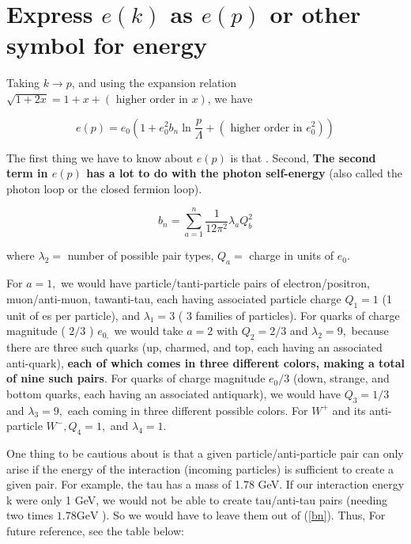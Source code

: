 \section{Express \texorpdfstring{$e(k)$ as $e(p)$ or other symbol for energy}{TEXT}}
Taking $k\to p$, and using the expansion relation $\sqrt{1+2 x}=1+x+(\text { higher order in } x)$, we have
\begin{qt}
    \begin{equation}e(p)=e_{0}\left(1+e_{0}^{2} b_{n} \ln \frac{p}{\Lambda}+\left(\text { higher order in } e_{0}^{2}\right)\right)
    \label{e(p)}
    \end{equation}
\end{qt}
The first thing we have to know about $e(p)$ is that . Second, \textbf{The second term in $e(p)$ has a lot to do with the photon self-energy }(also called the photon loop or the closed fermion loop). 
\begin{qt}
    \begin{equation}b_{n}=\sum_{a=1}^{n} \frac{1}{12 \pi^{2}} \lambda_{a} Q_{b}^{2}\end{equation}
    \label{bn}
\end{qt}
where $\lambda_{2}=$ number of possible pair types, $Q_{a}=$ charge in units of $e_{0}$.

For $a=1,$ we would have particle/tanti-particle pairs of electron/positron, muon/anti-muon, tawanti-tau, each having associated particle charge $Q_{1}=1$ (1 unit of es per particle), and $\lambda_{1}=3$ ( 3 families of particles). For quarks of charge magnitude ( $2 / 3$ ) $e_{0,}$ we would take $a=2$ with $Q_{2}=2 / 3$ and $\lambda_{2}=9,$ because there are three such quarks (up, charmed, and top, each having an associated anti-quark),\textbf{ each of which comes in three different colors, making a total of nine such pairs}. For quarks of charge magnitude $e_0/3$ (down, strange, and bottom quarks, each having an associated antiquark), we would have $Q_{3}=1 / 3$ and $\lambda_{3}=9,$ each coming in three different possible colors. For $W^{+}$ and its anti-particle $W^{-}, Q_{4}=1,$ and $\lambda_{4}=1$.

One thing to be cautious about is that a given particle/anti-particle pair can only arise if the energy of the interaction (incoming particles) is sufficient to create a given pair. For example, the tau has a mass of 1.78 GeV. If our interaction energy k were only 1 GeV, we would not be able to create tau/anti-tau pairs (needing two times $1.78 \mathrm{GeV}$ ). So we would have to leave them out of (\ref{bn}). Thus,  For future reference, see the table below:

